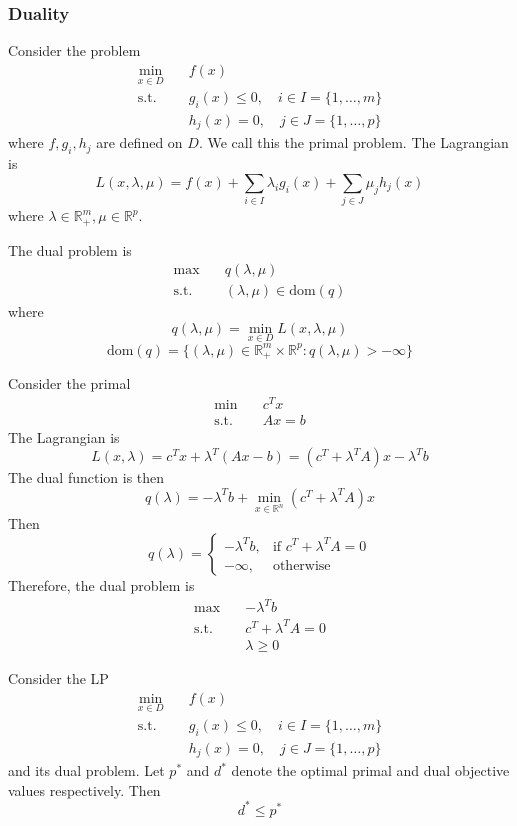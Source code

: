 \subsubsection{Duality}
Consider the problem
\begin{align*}
    \min_{x \in D} \quad &f(x) \\
    \mathrm{s.t.} \quad &g_i(x) \leq 0, \quad i \in I = \{1,\ldots,m\} \\
    &h_j(x) = 0, \quad j \in J = \{1,\ldots,p\}
\end{align*}
where $f, g_i, h_j$ are defined on $D$. We call this the primal problem. The Lagrangian is
$$L(x, \lambda, \mu) = f(x) + \sum_{i \in I} \lambda_i g_i(x) + \sum_{j \in J} \mu_j h_j(x)$$
where $\lambda \in \mathbb R^m_+, \mu \in \mathbb R^p$.

\bigskip
The dual problem is
\begin{align*}
    \max \quad &q(\lambda, \mu) \\
    \text{s.t.} \quad &(\lambda, \mu) \in \mathrm{dom}(q)
\end{align*}
where $$q(\lambda, \mu) = \min_{x \in D} L(x, \lambda, \mu)$$ $$\mathrm{dom}(q) = \{(\lambda, \mu) \in \mathbb R^m_+ \times \mathbb R^p: q(\lambda, \mu) > -\infty\}$$

\begin{example}
    Consider the primal 
    \begin{align*}
        \min \quad &c^Tx \\
        \text{s.t.} \quad &Ax = b
    \end{align*}
    The Lagrangian is $$L(x, \lambda) = c^Tx + \lambda^T(Ax - b) = (c^T + \lambda^TA)x - \lambda^Tb$$
    The dual function is then $$q(\lambda) =  -\lambda^Tb + \min_{x \in \mathbb R^n} (c^T + \lambda^TA)x$$
    Then $$q(\lambda) = \begin{cases}
        -\lambda^Tb, &\text{if } c^T + \lambda^TA = 0 \\
        -\infty, &\text{otherwise}
    \end{cases}$$ Therefore, the dual problem is 
    \begin{align*}
        \max \quad &-\lambda^Tb \\
        \text{s.t.} \quad &c^T + \lambda^TA = 0 \\
        &\lambda \geq 0
    \end{align*}
\end{example}
\begin{theorem}
    Consider the LP
    \begin{align*}
        \min_{x \in D} \quad &f(x) \\
        \mathrm{s.t.} \quad &g_i(x) \leq 0, \quad i \in I = \{1,\ldots,m\} \\
        &h_j(x) = 0, \quad j \in J = \{1,\ldots,p\}
    \end{align*}
    and its dual problem. Let $p^*$ and $d^*$ denote the optimal primal and dual objective values respectively. Then $$d^* \leq p^*$$
\end{theorem}